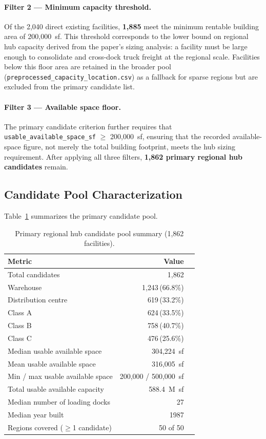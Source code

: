 \paragraph{Filter 2 — Minimum capacity threshold.}
Of the 2,040 direct existing facilities, \textbf{1,885} meet the minimum rentable building
area of 200{,}000~sf. This threshold corresponds to the lower bound on regional hub
capacity derived from the paper's sizing analysis: a facility must be large enough to
consolidate and cross-dock truck freight at the regional scale. Facilities below this
floor area are retained in the broader pool
(\texttt{preprocessed\_capacity\_location.csv}) as a fallback for sparse regions but are
excluded from the primary candidate list.

\paragraph{Filter 3 — Available space floor.}
The primary candidate criterion further requires that
\texttt{usable\_available\_space\_sf} $\geq$ 200{,}000~sf, ensuring that the recorded
available-space figure, not merely the total building footprint, meets the hub sizing
requirement. After applying all three filters, \textbf{1,862 primary regional hub
candidates} remain.

\subsection{Candidate Pool Characterization}

Table~\ref{tab:task4-pool} summarizes the primary candidate pool.

\begin{table}[H]
  \centering
  \caption{Primary regional hub candidate pool summary (1,862 facilities).}
  \label{tab:task4-pool}
  \begin{tabular}{lrr}
    \toprule
    Metric & Value \\
    \midrule
    Total candidates & 1{,}862 \\
    Warehouse & 1{,}243\,(66.8\%) \\
    Distribution centre & \phantom{0}619\,(33.2\%) \\
    Class A & \phantom{0}624\,(33.5\%) \\
    Class B & \phantom{0}758\,(40.7\%) \\
    Class C & \phantom{0}476\,(25.6\%) \\
    Median usable available space & 304{,}224~sf \\
    Mean usable available space & 316{,}005~sf \\
    Min / max usable available space & 200{,}000 / 500{,}000~sf \\
    Total usable available capacity & 588.4~M~sf \\
    Median number of loading docks & 27 \\
    Median year built & 1987 \\
    Regions covered ($\geq$1 candidate) & 50 of 50 \\
    \bottomrule
  \end{tabular}
\end{table}

